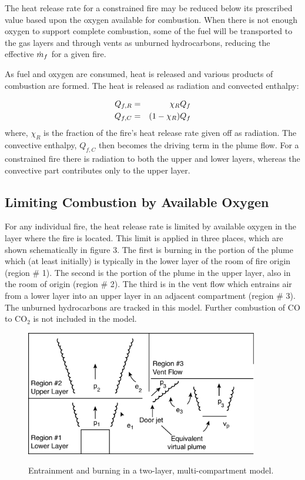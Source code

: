 The heat release rate for a constrained fire may be reduced below its prescribed value based upon the oxygen available for combustion.  When there is not enough oxygen to support complete combustion, some of the fuel will be transported to the gas layers and through vents as unburned hydrocarbons, reducing the effective $\dot{m}_f$ for a given fire.

As fuel and oxygen are consumed, heat is released and various products of combustion are formed. The heat is released as radiation and convected enthalpy:

\begin{eqnarray} Q_{f,R} &=& \chi_R Q_f \\
Q_{f,C} &=& { \left( {1-\chi_R} \right) } Q_f
\end{eqnarray}
where, $\chi_R$ is the fraction  of the fire's heat release rate given off as radiation.  The convective enthalpy, $Q_{f,C}$ then becomes the driving term in the plume flow.  For a constrained fire there is radiation to both the upper and lower layers, whereas the convective part contributes only to the upper layer.

\subsection{Limiting Combustion by Available Oxygen \label{sec:Oxygen_Limit}}

For any individual fire, the heat release rate is limited by available oxygen in the layer where the fire is located. This limit is applied in three places, which are shown schematically in figure 3. The first is burning in the portion of the plume which (at least initially) is typically in the lower layer of the room of fire origin (region \# 1).  The second is the portion of the plume in the upper layer, also in the room of origin (region \# 2).  The third is in the vent flow which entrains air from a lower layer into an upper layer in an adjacent compartment (region \# 3). The unburned hydrocarbons are tracked in this model.  Further combustion of CO to $\mathrm{CO_2}$ is not included in the model.

\begin{figure}[h]
\begin{center}
\includegraphics[width=4.0in]{FIGURES/Theory/Fire_entrain}\\
\end{center}
\caption{Entrainment and burning in a two-layer, multi-compartment model.}
 \label{fig:Burning_Regions}
\end{figure}

